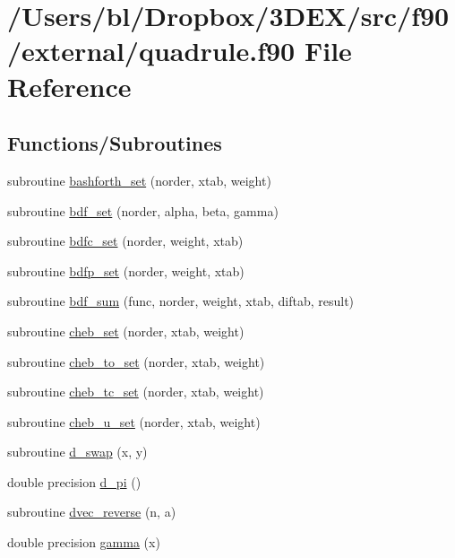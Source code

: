 \hypertarget{quadrule_8f90}{
\section{/Users/bl/Dropbox/3DEX/src/f90/external/quadrule.f90 File Reference}
\label{quadrule_8f90}
}
\subsection*{Functions/Subroutines}
\begin{DoxyCompactItemize}
\item 
subroutine \hyperlink{quadrule_8f90_a5db7bba3aa7d37d932b3f545141b52d4}{bashforth\_\-set} (norder, xtab, weight)
\item 
subroutine \hyperlink{quadrule_8f90_a33c49c6fa2701ed35a7132dfa2ee7a90}{bdf\_\-set} (norder, alpha, beta, gamma)
\item 
subroutine \hyperlink{quadrule_8f90_a7888ddfbe8865b018471ece2f1ac169b}{bdfc\_\-set} (norder, weight, xtab)
\item 
subroutine \hyperlink{quadrule_8f90_ae1f2722140b0af5e1a2bf8e5877222aa}{bdfp\_\-set} (norder, weight, xtab)
\item 
subroutine \hyperlink{quadrule_8f90_aed98218103418a57a42bce561d3f221a}{bdf\_\-sum} (func, norder, weight, xtab, diftab, result)
\item 
subroutine \hyperlink{quadrule_8f90_ade9f4e674221ccedd6251da05db6bbba}{cheb\_\-set} (norder, xtab, weight)
\item 
subroutine \hyperlink{quadrule_8f90_a54208a5fdf9d1d82565b1aa741c51811}{cheb\_\-to\_\-set} (norder, xtab, weight)
\item 
subroutine \hyperlink{quadrule_8f90_aa1f1a725b4cc2ef2f039255e99227f0d}{cheb\_\-tc\_\-set} (norder, xtab, weight)
\item 
subroutine \hyperlink{quadrule_8f90_ac7f04c61f2321ddc4bbf90358305d11e}{cheb\_\-u\_\-set} (norder, xtab, weight)
\item 
subroutine \hyperlink{quadrule_8f90_ab73cf601dce50b6fc79d82a6ee87bb67}{d\_\-swap} (x, y)
\item 
double precision \hyperlink{quadrule_8f90_a1196e8a1c04167d129db7f177728d7fc}{d\_\-pi} ()
\item 
subroutine \hyperlink{quadrule_8f90_a7841cf442902dd98d08b6a4d89a9a7bf}{dvec\_\-reverse} (n, a)
\item 
double precision \hyperlink{quadrule_8f90_a688af4295664e9e84424169e79729a11}{gamma} (x)

\end{DoxyCompactItemize}
